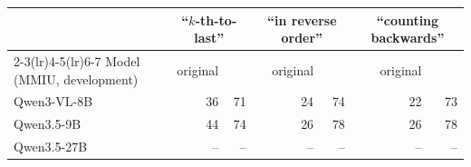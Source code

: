 \begin{tabular}{lrrrrrr}
\toprule
& \multicolumn{2}{c}{``$k$-th-to-last''} & \multicolumn{2}{c}{``in reverse order''} & \multicolumn{2}{c}{``counting backwards''} \\
\cmidrule(lr){2-3}\cmidrule(lr){4-5}\cmidrule(lr){6-7}
Model (MMIU, development) & original & \rthree{} & original & \rthree{} & original & \rthree{} \\
\midrule
Qwen3-VL-8B & 36 & 71 & 24 & 74 & 22 & 73 \\
Qwen3.5-9B & 44 & 74 & 26 & 78 & 26 & 78 \\
Qwen3.5-27B & -- & -- & -- & -- & -- & -- \\
\bottomrule
\end{tabular}
